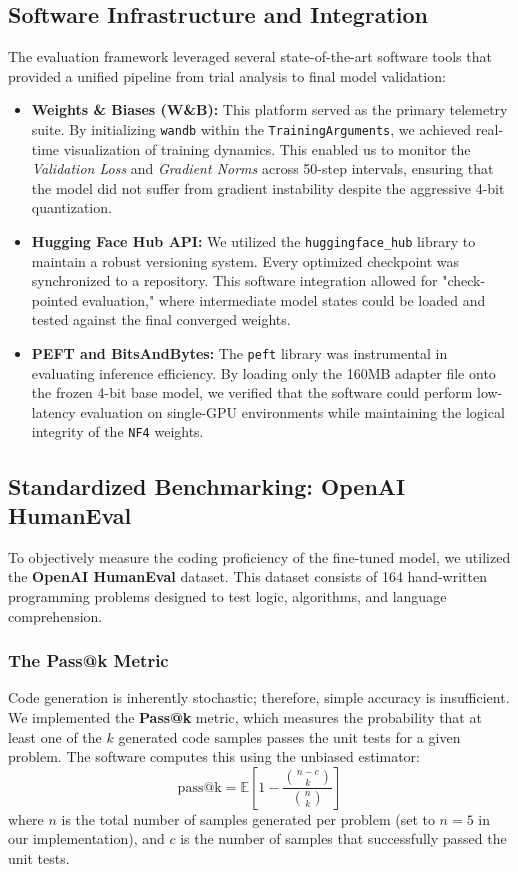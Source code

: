 \subsection{Software Infrastructure and Integration}
The evaluation framework leveraged several state-of-the-art software tools that provided a unified pipeline from trial analysis to final model validation:

\begin{itemize}
    \item \textbf{Weights \& Biases (W\&B):} This platform served as the primary telemetry suite. By initializing \texttt{wandb} within the \texttt{TrainingArguments}, we achieved real-time visualization of training dynamics. This enabled us to monitor the \textit{Validation Loss} and \textit{Gradient Norms} across 50-step intervals, ensuring that the model did not suffer from gradient instability despite the aggressive 4-bit quantization.
    
    \item \textbf{Hugging Face Hub API:} We utilized the \texttt{huggingface\_hub} library to maintain a robust versioning system. Every optimized checkpoint was synchronized to a repository. This software integration allowed for "check-pointed evaluation," where intermediate model states could be loaded and tested against the final converged weights.
    
    \item \textbf{PEFT and BitsAndBytes:} The \texttt{peft} library was instrumental in evaluating inference efficiency. By loading only the 160MB adapter file onto the frozen 4-bit base model, we verified that the software could perform low-latency evaluation on single-GPU environments while maintaining the logical integrity of the \texttt{NF4} weights.
\end{itemize}


\subsection{Standardized Benchmarking: OpenAI HumanEval}
To objectively measure the coding proficiency of the fine-tuned model, we utilized the \textbf{OpenAI HumanEval} dataset. This dataset consists of 164 hand-written programming problems designed to test logic, algorithms, and language comprehension.
\subsubsection{The Pass@k Metric}
Code generation is inherently stochastic; therefore, simple accuracy is insufficient. We implemented the \textbf{Pass@k} metric, which measures the probability that at least one of the $k$ generated code samples passes the unit tests for a given problem. 
The software computes this using the unbiased estimator:
$$ \text{pass@k} = \mathbb{E} \left[ 1 - \frac{\binom{n-c}{k}}{\binom{n}{k}} \right] $$
where $n$ is the total number of samples generated per problem (set to $n=5$ in our implementation), and $c$ is the number of samples that successfully passed the unit tests.


